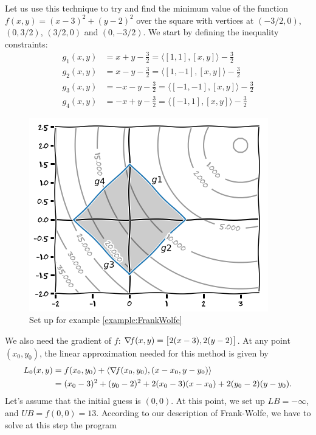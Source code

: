 \begin{example}\label{example:FrankWolfe}
Let us use this technique to try and find the minimum value of the function $f(x,y)=(x-3)^2+(y-2)^2$ over the square with vertices at $(-3/2, 0)$, $(0, 3/2)$, $(3/2, 0)$ and $(0, -3/2)$. We start by defining the inequality constraints:
\begin{align*}
g_1(x,y) &= x+y-\tfrac{3}{2} = \langle [1,1], [x,y] \rangle - \tfrac{3}{2} \\
g_2(x,y) &= x-y-\tfrac{3}{2} = \langle [1,-1], [x,y] \rangle - \tfrac{3}{2} \\
g_3(x,y) &= -x-y-\tfrac{3}{2} = \langle [-1,-1], [x,y] \rangle - \tfrac{3}{2} \\
g_4(x,y) &= -x+y-\tfrac{3}{2} = \langle [-1,1], [x,y] \rangle - \tfrac{3}{2}
\end{align*}
\begin{figure}[ht!]
\includegraphics[width=0.75\linewidth]{Extras/frankwolfesetup.png}
\caption{Set up for example \ref{example:FrankWolfe}}\label{figure:FrankWolfesetup}
\end{figure}
We also need the gradient of $f$: $\mathop{\nabla\! {f}}(x,y) = \big[ 2(x-3), 2(y-2) \big]$. At any point $(x_0,y_0)$, the linear approximation needed for this method is given by
\begin{align*}
L_0(x,y) &= f(x_0,y_0) + \langle \mathop{\nabla\! {f}}(x_0, y_0), (x-x_0,y-y_0) \rangle \\
&= (x_0-3)^2 + (y_0-2)^2 + 2(x_0-3)(x-x_0) + 2(y_0-2)(y-y_0).
\end{align*}
Let's assume that the initial guess is $(0,0)$.  At this point, we set up $LB=-\infty$, and $UB=f(0,0)=13$.  According to our description of Frank-Wolfe, we have to solve at this step the program
\begin{equation*}

\end{equation*}
\end{example}

